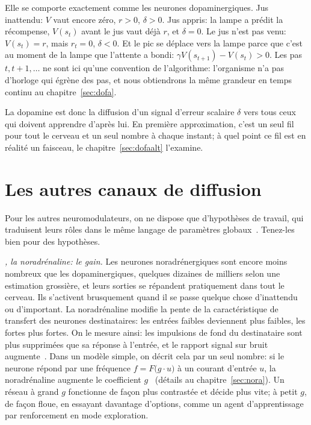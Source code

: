 Elle se comporte exactement comme les neurones dopaminergiques. Jus inattendu: $V$ vaut encore zéro, $r>0$, $\delta>0$. Jus appris: la lampe a prédit la récompense, $V(s_t)$ avant le jus vaut déjà $r$, et $\delta=0$. Le jus n'est pas venu: $V(s_t)=r$, mais $r_t=0$, $\delta<0$. Et le pic se déplace vers la lampe parce que c'est au moment de la lampe que l'attente a bondi: $\gamma V(s_{t+1})-V(s_t)>0$. Les pas $t,t+1,\dots$ ne sont ici qu'une convention de l'algorithme: l'organisme n'a pas d'horloge qui égrène des pas, et nous obtiendrons la même grandeur en temps continu au chapitre~\ref{sec:dofa}.

La dopamine est donc la diffusion d'un signal d'erreur scalaire $\delta$ vers tous ceux qui doivent apprendre d'après lui. En première approximation, c'est un seul fil pour tout le cerveau et un seul nombre à chaque instant; à quel point ce fil est en réalité un faisceau, le chapitre~\ref{sec:dofaalt} l'examine.

\section{Les autres canaux de diffusion}

Pour les autres neuromodulateurs, on ne dispose que d'hypothèses de travail, qui traduisent leurs rôles dans le même langage de paramètres globaux~\cite{Doya2002}. Tenez-les bien pour des hypothèses.

\emph{, la noradrénaline: le gain.} Les neurones noradrénergiques sont encore moins nombreux que les dopaminergiques, quelques dizaines de milliers selon une estimation grossière, et leurs sorties se répandent pratiquement dans tout le cerveau. Ils s'activent brusquement quand il se passe quelque chose d'inattendu ou d'important. La noradrénaline modifie la pente de la caractéristique de transfert des neurones destinataires: les entrées faibles deviennent plus faibles, les fortes plus fortes. On le mesure ainsi: les impulsions de fond du destinataire sont plus supprimées que sa réponse à l'entrée, et le rapport signal sur bruit augmente~\cite{Foote1975NE}. Dans un modèle simple, on décrit cela par un seul nombre: si le neurone répond par une fréquence $f=F\bigl(g\cdot u\bigr)$ à un courant d'entrée $u$, la noradrénaline augmente le coefficient $g$~\cite{AstonJones2005} (détails au chapitre~\ref{sec:nora}). Un réseau à grand $g$ fonctionne de façon plus \og contrastée\fg{} et décide plus vite; à petit $g$, de façon \og floue\fg, en essayant davantage d'options, comme un agent d'apprentissage par renforcement en mode exploration.

